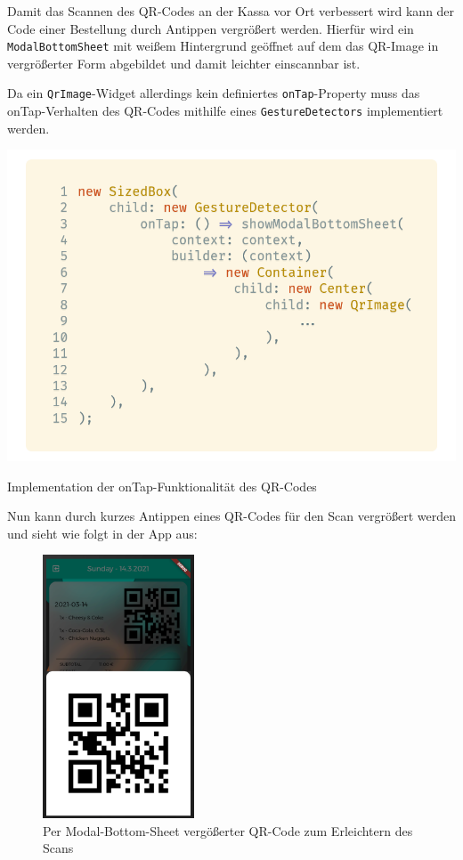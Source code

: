 Damit das Scannen des QR-Codes an der Kassa vor Ort verbessert wird kann der Code einer Bestellung
durch Antippen vergrößert werden. Hierfür wird ein \lstinline{ModalBottomSheet} mit weißem Hintergrund
geöffnet auf dem das QR-Image in vergrößerter Form abgebildet und damit leichter einscannbar ist.

Da ein \lstinline{QrImage}-Widget allerdings kein definiertes \lstinline{onTap}-Property muss
das onTap-Verhalten des QR-Codes mithilfe eines \lstinline{GestureDetectors} implementiert werden.

\begin{code}[H]
    \centering
    \includegraphics[width=1\textwidth]{images/Client/views/orderview/gesturedetector.png}
    \vspace{-20pt}
    \caption{Implementation der onTap-Funktionalität des QR-Codes}
    \label{dismissible}
\end{code}

\newpage

Nun kann durch kurzes Antippen eines QR-Codes für den Scan vergrößert werden und sieht wie folgt
in der App aus:

\begin{figure}[H]
    \centering
    \includegraphics[width=0.40\textwidth]{images/Client/views/orderview/qrcode.png}
    \caption{Per Modal-Bottom-Sheet vergößerter QR-Code zum Erleichtern des Scans}
\end{figure}

